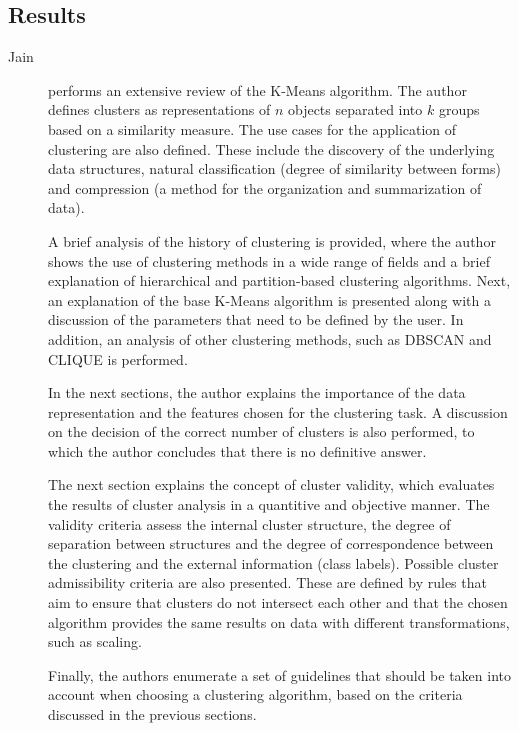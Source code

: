 \subsection{Results}\label{sec:cluster_results}
\begin{description}
    \item[Jain]\cite{Jain_Dataclustering50_2010} performs an extensive review of the K-Means algorithm. The author defines clusters as representations of $n$ objects separated into $k$ groups based on a similarity measure. The use cases for the application of clustering are also defined. These include the discovery of the underlying data structures, natural classification (degree of similarity between forms) and compression (a method for the organization and summarization of data).
    
    A brief analysis of the history of clustering is provided, where the author shows the use of clustering methods in a wide range of fields and a brief explanation of hierarchical and partition-based clustering algorithms. Next, an explanation of the base K-Means algorithm is presented along with a discussion of the parameters that need to be defined by the user. In addition, an analysis of other clustering methods, such as DBSCAN and CLIQUE is performed. 

    In the next sections, the author explains the importance of the data representation and the features chosen for the clustering task. A discussion on the decision of the correct number of clusters is also performed, to which the author concludes that there is no definitive answer.

    The next section explains the concept of cluster validity, which evaluates the results of cluster analysis in a quantitive and objective manner. The validity criteria assess the internal cluster structure, the degree of separation between structures and the degree of correspondence between the clustering and the external information (class labels). Possible cluster admissibility criteria are also presented. These are defined by rules that aim to ensure that clusters do not intersect each other and that the chosen algorithm provides the same results on data with different transformations, such as scaling.
    
    Finally, the authors enumerate a set of guidelines that should be taken into account when choosing a clustering algorithm, based on the criteria discussed in the previous sections.
\end{description}

